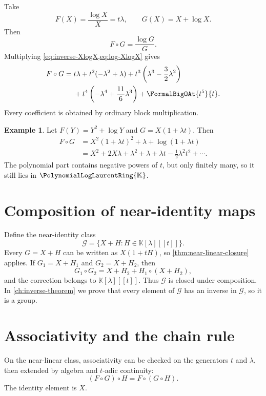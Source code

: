 \documentclass[11pt,openany]{book}
\theoremstyle{definition}
\newtheorem{example}{Example}[chapter]
\theoremstyle{plain}
\theoremstyle{remark}
\newcommand{\K}{\mathbb{K}}
\newcommand{\Plog}{\PolynomialLogLaurentRing{\K}}
\begin{document}
\begin{workedbox}
Take
\[
 F(X)=\frac{\log X}{X}=t\lambda,
 \qquad G(X)=X+\log X.
\]
Then
\[
 F\circ G=\frac{\log G}{G}.
\]
Multiplying \cref{eq:inverse-XlogX,eq:log-XlogX} gives
\begin{align}
 F\circ G={}&t\lambda+t^2(-\lambda^2+\lambda)
 +t^3\left(\lambda^3-\frac32\lambda^2\right)\notag\\
 &+t^4\left(-\lambda^4+\frac{11}{6}\lambda^3\right)
 +\FormalBigOAt{t^5}{t}.
\label{eq:compose-log-over-x}
\end{align}
Every coefficient is obtained by ordinary block multiplication.
\end{workedbox}

\begin{example}
Let \(F(Y)=Y^2+\log Y\) and \(G=X(1+\lambda t)\). Then
\begin{align*}
 F\circ G
 &=X^2(1+\lambda t)^2+\lambda+\log(1+\lambda t)\\
 &=X^2+2X\lambda+\lambda^2+\lambda
 +\lambda t-\frac12\lambda^2t^2+\cdots.
\end{align*}
The polynomial part contains negative powers of \(t\), but only finitely many, so it still lies in \(\Plog\).
\end{example}

\section{Composition of near-identity maps}
Define the near-identity class
\begin{equation}\label{eq:near-identity-class}
 \mathcal G=\{X+H:H\in\K[\lambda][[t]]\}.
\end{equation}
Every \(G=X+H\) can be written as \(X(1+tH)\), so \cref{thm:near-linear-closure} applies. If \(G_1=X+H_1\) and \(G_2=X+H_2\), then
\begin{equation}\label{eq:near-identity-compose}
 G_1\circ G_2=X+H_2+H_1\circ(X+H_2),
\end{equation}
and the correction belongs to \(\K[\lambda][[t]]\). Thus \(\mathcal G\) is closed under composition. In \cref{ch:inverse-theorem} we prove that every element of \(\mathcal G\) has an inverse in \(\mathcal G\), so it is a group.

\section{Associativity and the chain rule}
On the near-linear class, associativity can be checked on the generators \(t\) and \(\lambda\), then extended by algebra and \(t\)-adic continuity:
\begin{equation}\label{eq:composition-associativity}
 (F\circ G)\circ H=F\circ(G\circ H).
\end{equation}
The identity element is \(X\).
\end{document}

